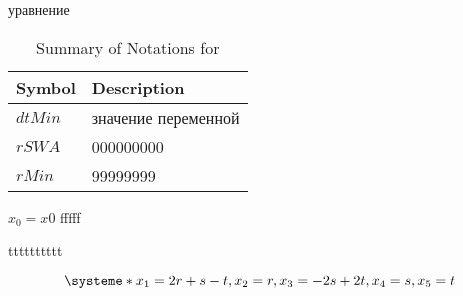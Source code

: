 \documentclass[a4paper,12pt]{article}
\begin{document}
уравнение

\begin{table} [h!] \label{Tab_Notations}
\caption{Summary of Notations for }
\begin{tabular}{l|l}
\hline
\textbf{Symbol} & \textbf{Description} \\
\hline \hline
$dtMin$ & значение переменной\\
$rSWA$ & 000000000 \\
\hline
 $rMin$ & 99999999 \\

 \hline
\end{tabular}
\end{table}

\begin{algorithm}[h!]  \label{App}
\SetAlgoLined
{}

$x_0=x0$ fffff\; 


 \caption{tttttttttt}
\end{algorithm}

\[
\systeme*{x_1=2r + s -t,x_2= r, x_3=-2s +2t, x_4=s, x_5=t}
\]
\end{document}
